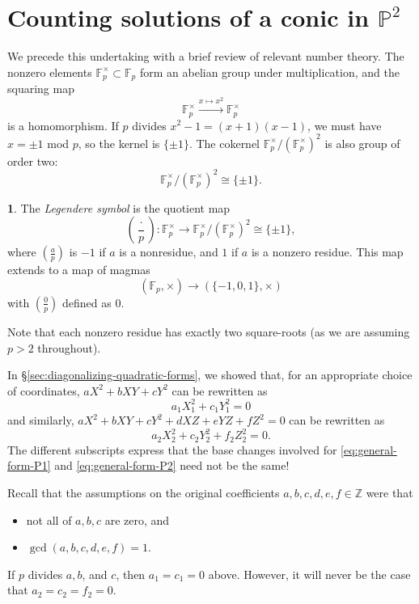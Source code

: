 \documentclass[10pt,a4paper]{amsart}
\numberwithin{equation}{section}
\numberwithin{figure}{section}
\theoremstyle{definition}
\theoremstyle{remark}
\theoremstyle{plain}
\theoremstyle{plain}
\theoremstyle{definition}
\newtheorem{defn}{\protect\definitionname}[section]
\theoremstyle{plain}
\theoremstyle{plain}
\providecommand{\definitionname}{Definition}
\newcommand{\legendre}[2]{\genfrac{(}{)}{}{}{#1}{#2}}
\renewcommand{\P}{\mathbb{P}}
\newcommand{\F}{\mathbb{F}}
\newcommand{\Z}{\mathbb{Z}}
\begin{document}
    \section{Counting solutions of a conic in $\P^2$} 

    We precede this undertaking with a brief review of relevant number theory.
    The nonzero elements $\F_p^\times \subset \F_p$ form an abelian
    group under multiplication, and the squaring map 
    \[ \F^\times_p \xrightarrow{x \mapsto x^2} \F^\times_p \] 
    is a homomorphism. If $p$ divides $x^2 - 1 = (x+1)(x-1)$, we must have 
    $x = \pm 1$ mod $p$, so the kernel is $\{\pm 1\}$. 
    The cokernel $\F_p^\times / (\F_p^\times)^2$ is also group of order two: 
    \[ \F_p^\times / (\F_p^\times)^2 \cong \{\pm 1\}.  \]
    \begin{defn}
        The \emph{Legendere symbol} is the quotient map    
        \[ \legendre{\cdot}{p}: 
            \F_p^\times \to \F_p^\times / (\F_p^\times)^2 \cong \{\pm 1\}, \]
        where $\legendre{a}{p}$ is $-1$ if $a$ is a nonresidue,
        and $1$ if $a$ is a nonzero residue. This map extends to a map of magmas
        \[ (\F_p,\times) \to (\{-1,0,1\}, \times) \]
        with $\legendre{0}{p}$ defined as $0$.
    \end{defn}
    
    Note that each nonzero residue has exactly two square-roots (as we are assuming
    $p > 2$ throughout).

    In \S\ref{sec:diagonalizing-quadratic-forms}, we showed that, for an
    appropriate choice of coordinates, $aX^2 + bXY + cY^2$ can be rewritten as
    \begin{equation}\label{eq:general-form-P1} 
        a_1 X_1^2 + c_1 Y_1^2 = 0
    \end{equation} 
    and similarly, $aX^2 + bXY + cY^2 + dXZ + eYZ + fZ^2 = 0$ can be
    rewritten as 
    \begin{equation}\label{eq:general-form-P2} 
        a_2 X_2^2 + c_2 Y_2^2 + f_2 Z_2^2 = 0.
    \end{equation}
    The different subscripts express that the base
    changes involved for \eqref{eq:general-form-P1} and \eqref{eq:general-form-P2}
    need not be the same!

    Recall that the assumptions on the original coefficients 
    $a,b,c,d,e,f \in \Z$ were that 
    \begin{itemize} 
        \item not all of $a,b,c$ are zero, and
        \item $\gcd(a,b,c,d,e,f) = 1$.  
    \end{itemize} 
    If $p$ divides $a,b$, and $c$, then $a_1 = c_1 = 0$ above. However, 
    it will never be the case that $a_2 = c_2 = f_2 = 0$.
\end{document}
